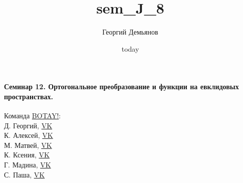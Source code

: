 \documentclass[a4paper,12pt]{article}
\title{sem_J_8}
\author{Георгий Демьянов}
\date{today}
\begin{document}
\paragraph{{\LARGE Семинар 12. Ортогональное преобразование и функции на евклидовых пространствах.}}













\begin{center}
	\vfill {\small 
			Команда \href{https://vk.com/botay_fizteh}{BOTAY!}:\\
			Д. Георгий, \href{https://vk.com/id37346992}{VK}\\
			К. Алексей, \href{https://vk.com/id92540660}{VK}\\
			М. Матвей, \href{https://vk.com/id62009425}{VK}\\
			К. Ксения, \href{https://vk.com/id143862366}{VK}\\
			Г. Мадина, \href{https://vk.com/id226312463}{VK}\\
			С. Паша, \href{https://vk.com/id181006282}{VK}\\
	}
\end{center}
\end{document}
